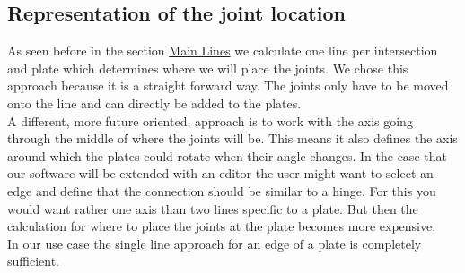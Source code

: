 \documentclass[../ClassicThesis.tex]{subfiles}
\begin{document}

\subsection{Representation of the joint location}
As seen before in the section \hyperref[mainLine]{Main Lines} we calculate one line per intersection and plate which determines where we will place the joints. We chose this approach because it is a straight forward way. The joints only have to be moved onto the line and can directly be added to the plates. \\
A different, more future oriented, approach is to work with the axis going through the middle of where the joints will be. This means it also defines the axis around which the plates could rotate when their angle changes. 
In the case that our software will be extended with an editor the user might want to select an edge and define that the connection should be similar to a hinge. For this you would want rather one axis than two lines specific to a plate. But then the calculation for where to place the joints at the plate becomes more expensive.\\
In our use case the single line approach for an edge of a plate is completely sufficient.
\end{document}

